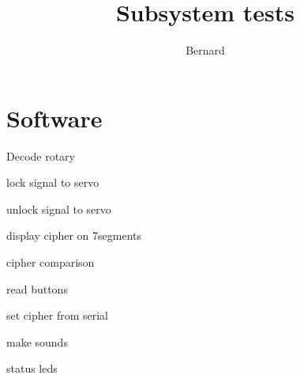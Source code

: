 \documentclass{report}
\title{Subsystem tests}
\author{Bernard}
\begin{document}
\chapter{Software}
\begin{description}
\item Decode rotary
\item lock signal to servo
\item unlock signal to servo
\item display cipher on 7segments
\item cipher comparison
\item read buttons
\item set cipher from serial
\item make sounds
\item status leds
\end{description}
\end{document}
